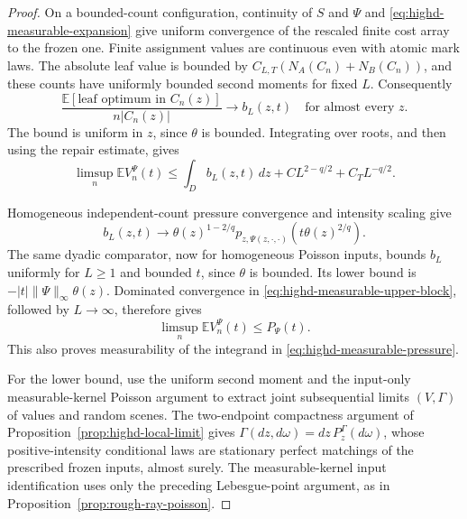 \documentclass[11pt,reqno]{amsart}
\theoremstyle{definition}
\theoremstyle{remark}
\numberwithin{equation}{section}
\newcommand{\E}{\mathbb E}
\begin{document}
\begin{proof}
On a bounded-count configuration, continuity of \(S\) and \(\Psi\)
and \eqref{eq:highd-measurable-expansion} give uniform convergence of
the rescaled finite cost array to the frozen one. Finite assignment
values are continuous even with atomic mark laws. The absolute leaf
value is bounded by \(C_{L,T}(N_A(C_n)+N_B(C_n))\), and these counts
have uniformly bounded second moments for fixed \(L\).
Consequently
\[
 \frac{\E[\text{leaf optimum in }C_n(z)]}{n|C_n(z)|}
                         \longrightarrow b_L(z,t)
 \quad\text{for almost every }z.
\]
The bound is uniform in \(z\), since \(\theta\) is bounded.
Integrating over roots, and then using the repair estimate, gives
\begin{equation}
\label{eq:highd-measurable-upper-block}
 \limsup_n\E V_n^\Psi(t)
 \le\int_D b_L(z,t)\,dz+C L^{2-q/2}+C_TL^{-q/2}.
\end{equation}

Homogeneous independent-count pressure convergence and intensity
scaling give
\[
 b_L(z,t)\longrightarrow
 \theta(z)^{1-2/q}
 p_{z,\Psi(z,\cdot,\cdot)}(t\theta(z)^{2/q}).
\]
The same dyadic comparator, now for homogeneous Poisson inputs,
bounds \(b_L\) uniformly for \(L\ge1\) and bounded \(t\), since
\(\theta\) is bounded. Its lower bound is
\(-|t|\|\Psi\|_\infty\theta(z)\). Dominated convergence in
\eqref{eq:highd-measurable-upper-block}, followed by \(L\to\infty\),
therefore gives
\begin{equation}
\label{eq:highd-measurable-upper}
                    \limsup_n\E V_n^\Psi(t)\le P_\Psi(t).
\end{equation}
This also proves measurability of the integrand in
\eqref{eq:highd-measurable-pressure}.

For the lower bound, use the uniform second moment and the
input-only measurable-kernel Poisson argument to extract joint
subsequential limits \((V,\Gamma)\) of values and random scenes.
The two-endpoint compactness argument of
Proposition~\ref{prop:highd-local-limit} gives
\(\Gamma(dz,d\omega)=dz\,P_z^\Gamma(d\omega)\), whose
positive-intensity conditional laws are stationary perfect matchings
of the prescribed frozen inputs, almost surely.
The measurable-kernel input identification uses only the preceding
Lebesgue-point argument, as in
Proposition~\ref{prop:rough-ray-poisson}.


\end{proof}
\end{document}
